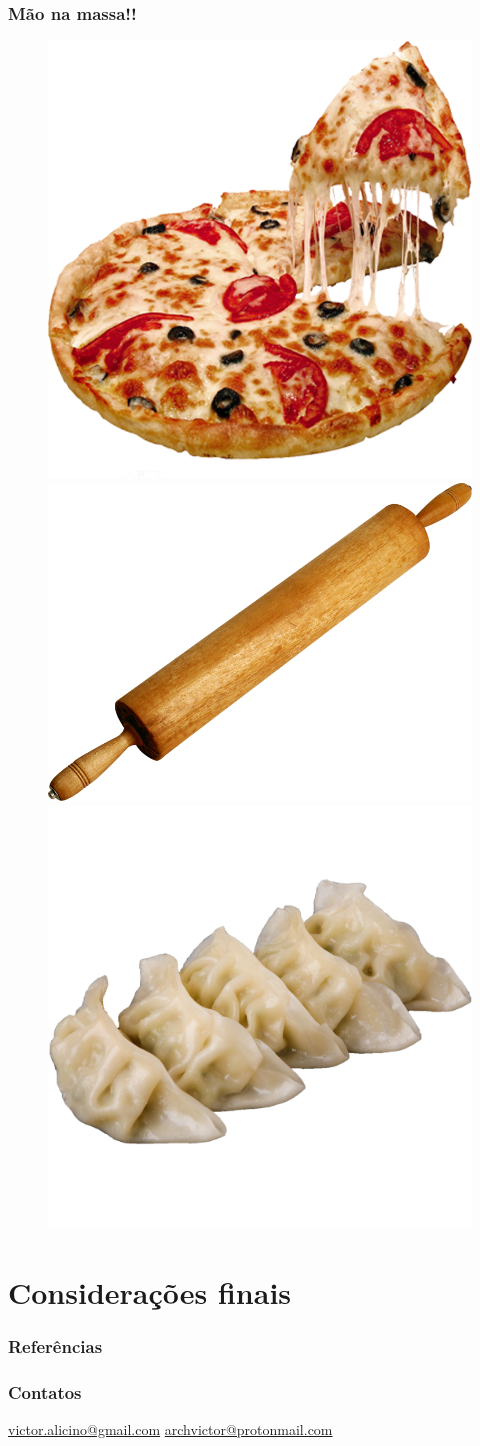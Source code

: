 \documentclass[12pt]{beamer}
\begin{document}
\begin{frame}
    \frametitle{Mão na massa!!}
    \begin{figure}
        \centering
        \includegraphics[width=.3\textwidth]{pizza.png}
        \includegraphics[width=.3\textwidth]{rolo.png}
        \includegraphics[width=.3\textwidth]{gyozas.png}
    \end{figure}
\end{frame}

\section{Considerações finais}
\begin{frame}[allowframebreaks]
    \frametitle{Referências}
    
\end{frame}

\begin{frame}
    \frametitle{Contatos}
    \centering
    \url{victor.alicino@gmail.com}
    \url{archvictor@protonmail.com}
\end{frame}
\end{document}
